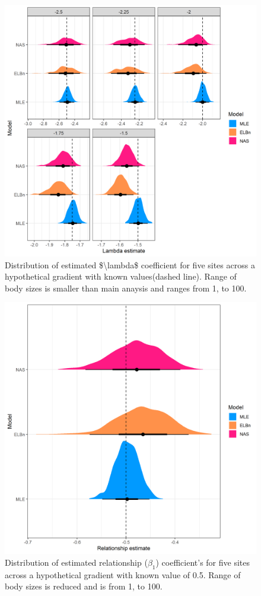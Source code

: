 \documentclass[
]{article}
\begin{document}
\begin{figure}
\centering
\includegraphics{figures/PLB_small_m_est_b_density.png}
\caption{Distribution of estimated \$\textbackslash lambda\$ coefficient
for five sites across a hypothetical gradient with known values(dashed
line). Range of body sizes is smaller than main anaysis and ranges from
1, to 100.}
\end{figure}

\begin{figure}
\centering
\includegraphics{figures/PLB_small_m_relationship_density.png}
\caption{Distribution of estimated relationship (\(\beta_1\))
coefficient's for five sites across a hypothetical gradient with known
value of 0.5. Range of body sizes is reduced and is from 1, to 100.}
\end{figure}
\end{document}
